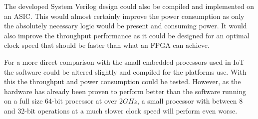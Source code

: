 \documentclass[12pt,twoside,a4paper]{report}
\begin{document}
	The developed System Verilog design could also be compiled and implemented on an ASIC. This would almost certainly improve the power consumption as only the absolutely necessary  logic would be present and consuming power. It would also improve the throughput performance as it could be designed for an optimal clock speed that should be faster than what an FPGA can achieve.
	
	For a more direct comparison with the small embedded processors used in IoT the software could be altered slightly and compiled for the platforms use. With this the throughput and power consumption could be tested. However, as the hardware has already been proven to perform better than the software running on a full size 64-bit processor at over $2GHz$, a small processor with between 8 and 32-bit operations at a much slower clock speed will perform even worse.
	
	
	

	\appendix    
\end{document}
